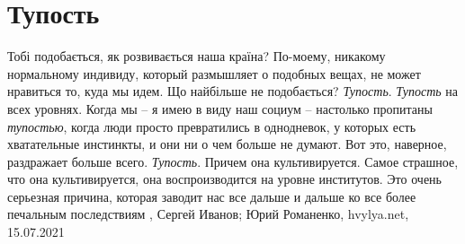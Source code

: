  
 
 
 
 
\chapter{Тупость}
\label{sec:slova.tupost}

Тобі подобається, як розвивається наша країна?  По-моему, никакому нормальному
индивиду, который размышляет о подобных вещах, не может нравиться то, куда мы
идем.  Що найбільше не подобається?  \emph{Тупость}. \emph{Тупость} на всех
уровнях. Когда мы – я имею в виду наш социум – настолько пропитаны
\emph{тупостью}, когда люди просто превратились в однодневок, у которых есть
хватательные инстинкты, и они ни о чем больше не думают. Вот это, наверное,
раздражает больше всего.  \emph{Тупость}. Причем она культивируется. Самое
страшное, что она культивируется, она воспроизводится на уровне институтов. Это
очень серьезная причина, которая заводит нас все дальше и дальше ко все более
печальным последствиям
, 
Сергей Иванов; Юрий Романенко, hvylya.net, 15.07.2021

